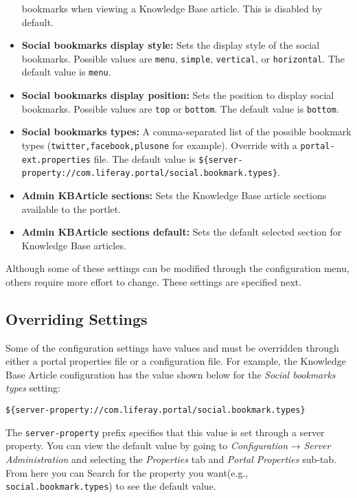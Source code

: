 \begin{itemize}
  bookmarks when viewing a Knowledge Base article. This is disabled by
  default.
\item
  \textbf{Social bookmarks display style:} Sets the display style of the
  social bookmarks. Possible values are \texttt{menu}, \texttt{simple},
  \texttt{vertical}, or \texttt{horizontal}. The default value is
  \texttt{menu}.
\item
  \textbf{Social bookmarks display position:} Sets the position to
  display social bookmarks. Possible values are \texttt{top} or
  \texttt{bottom}. The default value is \texttt{bottom}.
\item
  \textbf{Social bookmarks types:} A comma-separated list of the
  possible bookmark types (\texttt{twitter,facebook,plusone} for
  example). Override with a \texttt{portal-ext.properties} file. The
  default value is
  \texttt{\$\{server-property://com.liferay.portal/social.bookmark.types\}}.
\item
  \textbf{Admin KBArticle sections:} Sets the Knowledge Base article
  sections available to the portlet.
\item
  \textbf{Admin KBArticle sections default:} Sets the default selected
  section for Knowledge Base articles.
\end{itemize}

Although some of these settings can be modified through the
configuration menu, others require more effort to change. These settings
are specified next.

\subsection{Overriding Settings}\label{overriding-settings}

Some of the configuration settings have values and must be overridden
through either a portal properties file or a configuration file. For
example, the Knowledge Base Article configuration has the value shown
below for the \emph{Social bookmarks types} setting:

\begin{verbatim}
${server-property://com.liferay.portal/social.bookmark.types}
\end{verbatim}

The \texttt{server-property} prefix specifies that this value is set
through a server property. You can view the default value by going to
\emph{Configuration} → \emph{Server Administration} and selecting the
\emph{Properties} tab and \emph{Portal Properties} sub-tab. From here
you can Search for the property you want(e.g.,
\texttt{social.bookmark.types}) to see the default value.

